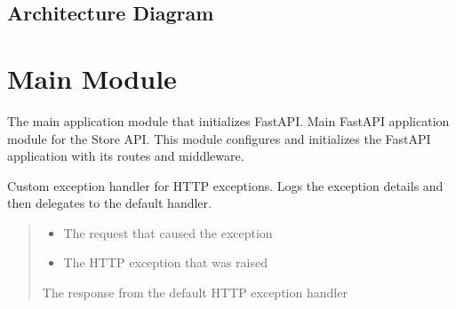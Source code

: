 \documentclass[letterpaper,10pt,openany,oneside,english]{sphinxmanual}
\begin{document}
\section{Architecture Diagram}
\label{\detokenize{modules/intro:architecture-diagram}}

\sphinxstepscope


\chapter{Main Module}
\label{\detokenize{modules/main:main-module}}\label{\detokenize{modules/main::doc}}
\sphinxAtStartPar
The main application module that initializes FastAPI.
\label{\detokenize{modules/main:module-storeapi.main}}
\sphinxAtStartPar
Main FastAPI application module for the Store API.
This module configures and initializes the FastAPI application with its routes and middleware.

\begin{savenotes}\begin{fulllineitems}
\label{\detokenize{modules/main:storeapi.main.custom_http_exception_handler}}
\pysigstartsignatures
{}
\pysigstopsignatures
\sphinxAtStartPar
Custom exception handler for HTTP exceptions.
Logs the exception details and then delegates to the default handler.
\begin{quote}\begin{description}
\begin{itemize}
\item {} 
\sphinxAtStartPar
{} \textendash{} The request that caused the exception

\item {} 
\sphinxAtStartPar
{} \textendash{} The HTTP exception that was raised

\end{itemize}

\sphinxAtStartPar
The response from the default HTTP exception handler

\end{description}\end{quote}

\end{fulllineitems}\end{savenotes}
\end{document}
